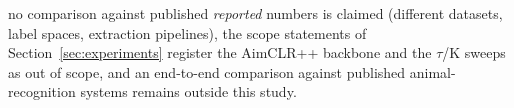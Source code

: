 no comparison against published \emph{reported} numbers is claimed (different datasets, label spaces, extraction pipelines), the scope statements of Section~\ref{sec:experiments} register the AimCLR++ backbone and the $\tau$/K sweeps as out of scope, and an end-to-end comparison against published animal-recognition systems remains outside this study.
